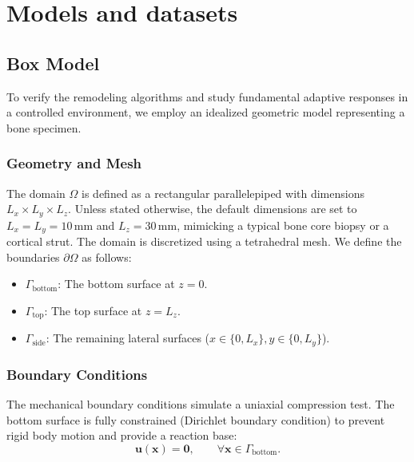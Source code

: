 \section*{Models and datasets}
\subsection*{Box Model}
To verify the remodeling algorithms and study fundamental adaptive responses in a controlled environment, we employ an idealized geometric model representing a bone specimen.
\subsubsection*{Geometry and Mesh}
The domain $\Omega$ is defined as a rectangular parallelepiped with dimensions $L_x \times L_y \times L_z$.
Unless stated otherwise, the default dimensions are set to $L_x = L_y = 10$\,mm and $L_z = 30$\,mm, mimicking a typical bone core biopsy or a cortical strut.
The domain is discretized using a tetrahedral mesh.
We define the boundaries $\partial\Omega$ as follows:
\begin{itemize}
    \item $\Gamma_{\mathrm{bottom}}$: The bottom surface at $z=0$.
    \item $\Gamma_{\mathrm{top}}$: The top surface at $z=L_z$.
    \item $\Gamma_{\mathrm{side}}$: The remaining lateral surfaces ($x\in\{0, L_x\}, y\in\{0, L_y\}$).
\end{itemize}
\subsubsection*{Boundary Conditions}
The mechanical boundary conditions simulate a uniaxial compression test. The bottom surface is fully constrained (Dirichlet boundary condition) to prevent rigid body motion and provide a reaction base:
\begin{equation}
\mathbf{u}(\mathbf{x}) = \mathbf{0}, \qquad \forall \mathbf{x} \in \Gamma_{\mathrm{bottom}}.
\end{equation}

